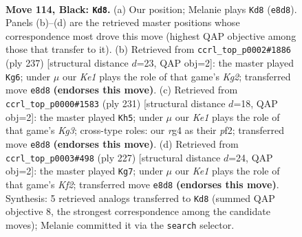 \documentclass[11pt]{article}
\begin{document}
\clearpage

\begin{figure}[p]\centering
\begin{subfigure}{0.46\textwidth}\centering
\resizebox{\linewidth}{!}{%
\newchessgame
\chessboard[
  setfen={4k3/6R1/4p3/4P3/5PR1/8/5K2/7r b - - 14 114},
  showmover=false,
  pgfstyle=straightmove, color=movearrow, markmove={e8-d8}
]}
\caption{}
\end{subfigure}\hfill
\begin{subfigure}{0.46\textwidth}\centering
\resizebox{\linewidth}{!}{%
\newchessgame
\chessboard[
  setfen={8/6k1/8/6p1/6P1/5P2/1R3K2/r7 b - - 4 119},
  showmover=false,
  pgfstyle=straightmove, color=movearrow, markmove={g7-g6}
]}
\caption{}
\end{subfigure}
\\[4pt]
\begin{subfigure}{0.46\textwidth}\centering
\resizebox{\linewidth}{!}{%
\newchessgame
\chessboard[
  setfen={8/8/6k1/4r3/5Rp1/2K3P1/5P2/8 b - - 34 116},
  showmover=false,
  pgfstyle=straightmove, color=movearrow, markmove={g6-h5}
]}
\caption{}
\end{subfigure}\hfill
\begin{subfigure}{0.46\textwidth}\centering
\resizebox{\linewidth}{!}{%
\newchessgame
\chessboard[
  setfen={8/5k2/8/6p1/6P1/4RK1P/8/r7 b - - 67 114},
  showmover=false,
  pgfstyle=straightmove, color=movearrow, markmove={f7-g7}
]}
\caption{}
\end{subfigure}
\caption{\textbf{Move 114, Black: \texttt{Kd8}.} (a) Our position; Melanie plays \texttt{Kd8} (\texttt{e8d8}). Panels (b)--(d) are the retrieved master positions whose correspondence most drove this move (highest QAP objective among those that transfer to it). (b) Retrieved from \texttt{ccrl\_top\_p0002\#1886} (ply 237) [structural distance $d$=23, QAP obj=2]: the master played \texttt{Kg6}; under $\mu$ our \emph{Ke1} plays the role of that game's \emph{Kg2}; transferred move \texttt{e8d8} \textbf{(endorses this move)}. (c) Retrieved from \texttt{ccrl\_top\_p0000\#1583} (ply 231) [structural distance $d$=18, QAP obj=2]: the master played \texttt{Kh5}; under $\mu$ our \emph{Ke1} plays the role of that game's \emph{Kg3}; cross-type roles: our \emph{r}g4 as their \emph{p}f2; transferred move \texttt{e8d8} \textbf{(endorses this move)}. (d) Retrieved from \texttt{ccrl\_top\_p0003\#498} (ply 227) [structural distance $d$=24, QAP obj=2]: the master played \texttt{Kg7}; under $\mu$ our \emph{Ke1} plays the role of that game's \emph{Kf2}; transferred move \texttt{e8d8} \textbf{(endorses this move)}. Synthesis: 5 retrieved analogs transferred to \texttt{Kd8} (summed QAP objective 8, the strongest correspondence among the candidate moves); Melanie committed it via the \texttt{search} selector.}
\label{fig:thought-m227}
\end{figure}
\end{document}

